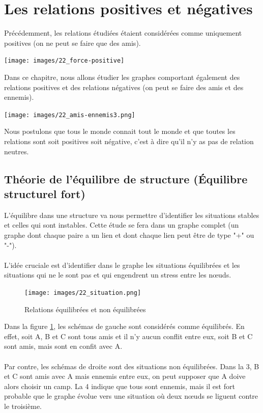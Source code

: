 \section{Les relations positives et négatives}

Précédemment, les relations étudiées étaient considérées comme uniquement positives (on ne peut se faire que des amis). 

\texttt{[image: images/22\_force-positive]}

Dans ce chapitre, nous allons étudier les graphes comportant également des relations positives et des relations négatives (on peut se faire des amis et des ennemis).

\texttt{[image: images/22\_amis-ennemis3.png]}

Nous postulons que tous le monde connait tout le monde et que toutes les relations sont soit positives soit négative, c’est à dire qu’il n’y as pas de relation neutres.

\subsection{Théorie de l'équilibre de structure (Équilibre structurel fort)}
L'équilibre dans une structure va nous permettre d'identifier les situations stables et celles qui sont instables. Cette étude se fera dans un graphe complet (un graphe dont chaque paire a un lien et dont chaque lien peut être de type "+" ou "-").

\paragraph{}
L'idée cruciale est d'identifier dans le graphe les situations équilibrées et les situations qui ne le sont pas et qui engendrent un stress entre les nœuds.  

\begin{figure}[h!]
	\centering
	\texttt{[image: images/22\_situation.png]}
	\caption{Relations équilibrées et non équilibrées}
    \label{equi}
\end{figure}


Dans la figure \ref{equi}, les schémas de gauche sont considérés comme équilibrés. En effet, soit A, B et C sont tous amis et il n'y aucun conflit entre eux, soit B et C sont amis, mais sont en confit avec A. 

\paragraph{}
Par contre, les schémas de droite sont des situations non équilibrées. Dans la 3, B et C sont amis avec A mais ennemis entre eux, on peut supposer que A doive alors choisir un camp. La 4 indique que tous sont ennemis, mais il est fort probable que le graphe évolue vers une situation où deux nœuds se liguent contre le troisième. 

